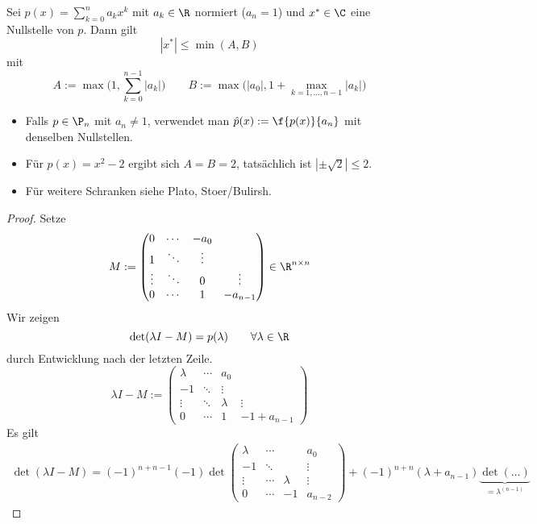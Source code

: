 \documentclass[11pt]{scrbook}
\begin{document}
\begin{st} \label{3.9}
	Sei $p(x) = \sum_{k=0}^n a_k x^k$ mit $a_k \in \R$ normiert ($a_n = 1$) und $x^* \in \C$ eine Nullstelle von $p$.
	Dann gilt
	\[
		|x^*| \le \min(A,B)
	\]
	mit
	\[
		A := \max\bigg(1, \sum_{k=0}^{n-1} |a_k| \bigg) \qquad
		B := \max\bigg(|a_0|, 1+\max_{k=1,\dotsc,n-1} |a_k|\bigg)
	\]
	\begin{note}
		\begin{itemize}
			\item
				Falls $p\in \P_n$ mit $a_n \neq 1$, verwendet man $\hat p(x) := \f {p(x)}{a_n}$ mit denselben Nullstellen.
			\item
				Für $p(x) = x^2-2$ ergibt sich $A=B=2$, tatsächlich ist $|\pm \sqrt2| \le 2$.
			\item
				Für weitere Schranken siehe Plato, Stoer/Bulirsh.
		\end{itemize}
	\end{note}
	\begin{proof}
		Setze
		\[
			M := \begin{pmatrix}
				0 & \cdots & -a_0 \\
				1 & \ddots & \vdots \\
				\vdots & \ddots & 0 & \vdots \\
				0 & \cdots & 1 & -a_{n-1}
			\end{pmatrix}
			\in \R^{n\times n}
		\]
		Wir zeigen
		\[
			\det(\lambda I - M) = p(\lambda) \qquad \forall \lambda \in \R
		\]
		durch Entwicklung nach der letzten Zeile.
		\[
			\lambda I - M := \begin{pmatrix}
				\lambda & \cdots & a_0 \\
				-1 & \ddots & \vdots \\
				\vdots & \ddots & \lambda & \vdots \\
				0 & \cdots & 1 & -1 + a_{n-1}
			\end{pmatrix}
		\]
		Es gilt
		\begin{align*}
			\det(\lambda I - M) = (-1)^{n+n-1}(-1) \det \begin{pmatrix}
				\lambda & \cdots & & a_0 \\
				-1 & \ddots & & \vdots \\
				\vdots & \cdots & \lambda & \vdots \\
				0 & \cdots & -1 & a_{n-2}
			\end{pmatrix}
			 + (-1)^{n+n} (\lambda + a_{n-1}) \underbrace{\det (\dotsc)}_{=\lambda^{(n-1)}}
		\end{align*}

\end{proof}
\end{st}
\end{document}
